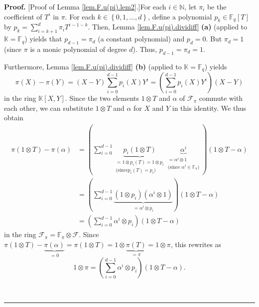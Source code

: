 \documentclass[numbers=enddot,12pt,final,onecolumn,notitlepage]{scrartcl}%
\theoremstyle{definition}
\newenvironment{proof}[1][Proof]{\noindent\textbf{#1.} }{\ \rule{0.5em}{0.5em}}
\let\sumnonlimits\sum
\renewcommand{\sum}{\sumnonlimits\limits}
\begin{document}
\begin{proof}
[Proof of Lemma \ref{lem.F.u(pi).lem2}.]For each $i\in\mathbb{N}$, let
$\pi_{i}$ be the coefficient of $T^{i}$ in $\pi$. For each $k\in\left\{
0,1,\ldots,d\right\}  $, define a polynomial $p_{k}\in\mathbb{F}_{q}\left[
T\right]  $ by $p_{k}=\sum_{i=k+1}^{d}\pi_{i}T^{i-1-k}$. Then, Lemma
\ref{lem.F.u(pi).dividiff} \textbf{(a)} (applied to $\mathbb{K}=\mathbb{F}%
_{q}$) yields that $p_{d-1}=\pi_{d}$ (a constant polynomial) and $p_{d}=0$.
But $\pi_{d}=1$ (since $\pi$ is a monic polynomial of degree $d$). Thus,
$p_{d-1}=\pi_{d}=1$.

Furthermore, Lemma \ref{lem.F.u(pi).dividiff} \textbf{(b)} (applied to
$\mathbb{K}=\mathbb{F}_{q}$) yields
\[
\pi\left(  X\right)  -\pi\left(  Y\right)  =\left(  X-Y\right)  \sum
_{i=0}^{d-1}p_{i}\left(  X\right)  Y^{i}=\left(  \sum_{i=0}^{d-1}p_{i}\left(
X\right)  Y^{i}\right)  \left(  X-Y\right)
\]
in the ring $\mathbb{K}\left[  X,Y\right]  $. Since the two elements $1\otimes
T$ and $\alpha$ of $\mathcal{F}_{\pi}$ commute with each other, we can
substitute $1\otimes T$ and $\alpha$ for $X$ and $Y$ in this identity. We thus
obtain%
\begin{align*}
\pi\left(  1\otimes T\right)  -\pi\left(  \alpha\right)   &  =\left(
\sum_{i=0}^{d-1}\underbrace{p_{i}\left(  1\otimes T\right)  }%
_{\substack{=1\otimes p_{i}\left(  T\right)  =1\otimes p_{i}\\\text{(since
}p_{i}\left(  T\right)  =p_{i}\text{)}}}\underbrace{\alpha^{i}}%
_{\substack{=\alpha^{i}\otimes1\\\text{(since }\alpha^{i}\in\mathbb{F}_{\pi
}\text{)}}}\right)  \left(  1\otimes T-\alpha\right)  \\
&  =\left(  \sum_{i=0}^{d-1}\underbrace{\left(  1\otimes p_{i}\right)  \left(
\alpha^{i}\otimes1\right)  }_{=\alpha^{i}\otimes p_{i}}\right)  \left(
1\otimes T-\alpha\right)  \\
&  =\left(  \sum_{i=0}^{d-1}\alpha^{i}\otimes p_{i}\right)  \left(  1\otimes
T-\alpha\right)
\end{align*}
in the ring $\mathcal{F}_{\pi}=\mathbb{F}_{\pi}\otimes\mathcal{F}$. Since
$\pi\left(  1\otimes T\right)  -\underbrace{\pi\left(  \alpha\right)  }%
_{=0}=\pi\left(  1\otimes T\right)  =1\otimes\underbrace{\pi\left(  T\right)
}_{=\pi}=1\otimes\pi$, this rewrites as
\begin{equation}
1\otimes\pi=\left(  \sum_{i=0}^{d-1}\alpha^{i}\otimes p_{i}\right)  \left(
1\otimes T-\alpha\right)  .\label{pf.lem.F.u(pi).lem2.1}%
\end{equation}



\end{proof}
\end{document}
